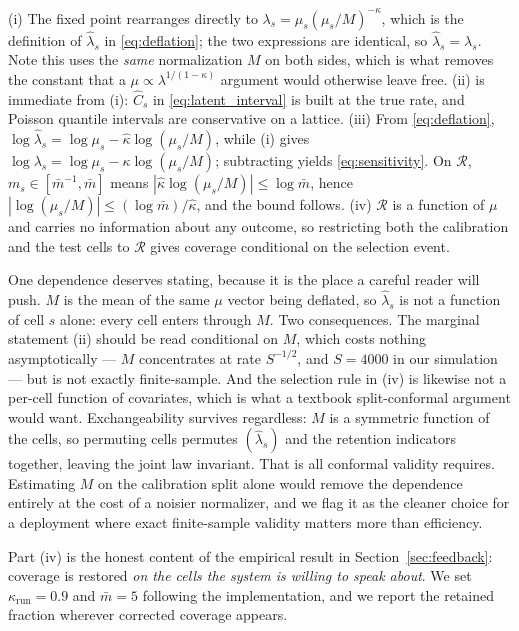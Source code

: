 \documentclass[journal,10pt,twocolumn]{IEEEtran}
\begin{document}
\begin{IEEEproof}
(i) The fixed point rearranges directly to
$\lambda_s = \mu_s (\mu_s/M)^{-\kappa}$, which is the definition of
$\hat\lambda_s$ in \eqref{eq:deflation}; the two expressions are identical, so
$\hat\lambda_s = \lambda_s$. Note this uses the \emph{same} normalization $M$ on
both sides, which is what removes the constant that a
$\mu \propto \lambda^{1/(1-\kappa)}$ argument would otherwise leave free.
(ii) is immediate from (i): $\widehat{C}_s$ in \eqref{eq:latent_interval} is
built at the true rate, and Poisson quantile intervals are conservative on a
lattice.
(iii) From \eqref{eq:deflation},
$\log\hat\lambda_s = \log\mu_s - \hat\kappa \log(\mu_s/M)$, while (i) gives
$\log\lambda_s = \log\mu_s - \kappa\log(\mu_s/M)$; subtracting yields
\eqref{eq:sensitivity}. On $\mathcal{R}$, $m_s \in [\bar{m}^{-1},\bar{m}]$ means
$|\hat\kappa \log(\mu_s/M)| \le \log \bar{m}$, hence
$|\log(\mu_s/M)| \le (\log \bar{m})/\hat\kappa$, and the bound follows.
(iv) $\mathcal{R}$ is a function of $\mu$ and carries no information about any
outcome, so restricting both the calibration and the test cells to $\mathcal{R}$
gives coverage conditional on the selection event.
\end{IEEEproof}

One dependence deserves stating, because it is the place a careful reader will
push. $M$ is the mean of the same $\mu$ vector being deflated, so
$\hat{\lambda}_s$ is not a function of cell $s$ alone: every cell enters through
$M$. Two consequences. The marginal statement (ii) should be read conditional on
$M$, which costs nothing asymptotically --- $M$ concentrates at rate
$S^{-1/2}$, and $S = 4000$ in our simulation --- but is not exactly
finite-sample. And the selection rule in (iv) is likewise not a per-cell function
of covariates, which is what a textbook split-conformal argument would want.
Exchangeability survives regardless: $M$ is a symmetric function of the cells, so
permuting cells permutes $(\hat{\lambda}_s)$ and the retention indicators
together, leaving the joint law invariant. That is all conformal validity
requires. Estimating $M$ on the calibration split alone would remove the
dependence entirely at the cost of a noisier normalizer, and we flag it as the
cleaner choice for a deployment where exact finite-sample validity matters more
than efficiency.

Part (iv) is the honest content of the empirical result in
Section~\ref{sec:feedback}: coverage is restored \emph{on the cells the system is
willing to speak about}. We set $\kappa_{\mathrm{run}} = 0.9$ and $\bar{m} = 5$
following the implementation, and we report the retained fraction wherever
corrected coverage appears.
\end{document}
